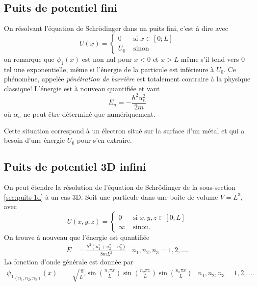 \subsection{Puits de potentiel fini}
On résolvant l'équation de Schrödinger dans un puits
fini, c'est à dire avec
\[ U(x) = \left\{
  \begin{aligned}
    0 & \text{ si } x \in [0; L]\\
    U_0 & \text{ sinon}
  \end{aligned}
\right. \]
on remarque que $\psi_1(x)$ est non nul pour $x < 0$ et $x > L$
même s'il tend vers 0 tel une exponentielle, même si l'énergie de
la particule est inférieure à $U_0$. Ce phénomène,
appelée \emph{pénétration de barrière} est totalement
contraire à la physique classique!
L'énergie est à nouveau quantifiée et vaut
\[
  E_n = -\frac{\hbar^2\alpha_n^2}{2m}
\]
où $\alpha_n$ ne peut être déterminé que numériquement.

\begin{myrem}
	Cette situation correspond à un électron
	situé sur la surface d'un métal et qui a besoin
	d'une énergie $U_0$ pour s'en extraire.
\end{myrem}

\subsection{Puits de potentiel 3D infini}
On peut étendre la résolution de l'équation de Schrödinger
de la sous-section \ref{sec:puits-1d} à un cas 3D.
Soit une particule dans une boite de volume $V = L^3$,
avec
\[ U(x,y,z) = \left\{
  \begin{aligned}
    0 & \text{ si } x,y,z \in [0; L]\\
    \infty & \text{ sinon}.
  \end{aligned}
\right. \]
On trouve à nouveau que l'énergie est quantifiée
\begin{align*}
  E & = \frac{h^2(n_1^2+n_2^2+n_3^2)}{8mL^2} & n_1,n_2,n_3 = 1, 2, \ldots.
\end{align*}
La fonction d'onde générale est donnée par
\begin{align*}
  {\psi_1}_{(n_1,n_2,n_3)}(x) & =
  \sqrt{\frac{8}{L^3}}\sin\left(\frac{n_1\pi x}{L}\right)
											\sin\left(\frac{n_2\pi x}{L}\right)
											\sin\left(\frac{n_3\pi x}{L}\right)& n_1,n_2,n_3 = 1, 2, \ldots.
\end{align*}

